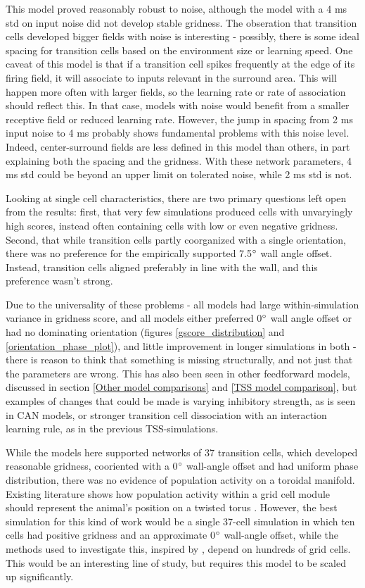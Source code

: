 \documentclass{article}
\begin{document}
    This model proved reasonably robust to noise, although the model with a 4 ms std on input noise did not develop stable gridness. The obseration that transition cells developed bigger fields with noise is interesting - possibly, there is some ideal spacing for transition cells based on the environment size or learning speed. One caveat of this model is that if a transition cell spikes frequently at the edge of its firing field, it will associate to inputs relevant in the surround area. This will happen more often with larger fields, so the learning rate or rate of association should reflect this. In that case, models with noise would benefit from a smaller receptive field or reduced learning rate. However, the jump in spacing from 2 ms input noise to 4 ms probably shows fundamental problems with this noise level. Indeed, center-surround fields are less defined in this model than others, in part explaining both the spacing and the gridness. With these network parameters, 4 ms std could be beyond an upper limit on tolerated noise, while 2 ms std is not.

    Looking at single cell characteristics, there are two primary questions left open from the results: first, that very few simulations produced cells with unvaryingly high scores, instead often containing cells with low or even negative gridness. Second, that while transition cells partly coorganized with a single orientation, there was no preference for the empirically supported 7.5\(\degree\) wall angle offset. Instead, transition cells aligned preferably in line with the wall, and this preference wasn't strong.

    Due to the universality of these problems - all models had large within-simulation variance in gridness score, and all models either preferred 0\(\degree\) wall angle offset or had no dominating orientation (figures \ref{gscore_distribution} and \ref{orientation_phase_plot}), and little improvement in longer simulations in both - there is reason to think that something is missing structurally, and not just that the parameters are wrong. This has also been seen in other feedforward models, discussed in section \ref{Other model comparisons} and \ref{TSS model comparison}, but examples of changes that could be made is varying inhibitory strength, as is seen in CAN models, or stronger transition cell dissociation with an interaction learning rule, as in the previous TSS-simulations.

    While the models here supported networks of 37 transition cells, which developed reasonable gridness, cooriented with a 0\(\degree\) wall-angle offset and had uniform phase distribution, there was no evidence of population activity on a toroidal manifold. Existing literature shows how population activity within a grid cell module should represent the animal's position on a twisted torus \parencite{Gardner2022}. However, the best simulation for this kind of work would be a single 37-cell simulation in which ten cells had positive gridness and an approximate 0\(\degree\) wall-angle offset, while the methods used to investigate this, inspired by \cite{Gardner2022}, depend on hundreds of grid cells. This would be an interesting line of study, but requires this model to be scaled up significantly. 
\end{document}
